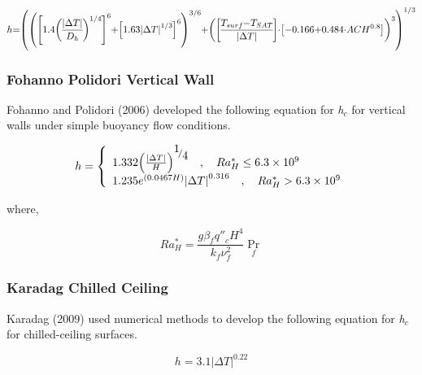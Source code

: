 \begin{equation}
\medmuskip=0mu
\thinmuskip=0mu
\thickmuskip=0mu
\nulldelimiterspace=0pt
\scriptspace=0pt
h = \left(
   \left(
    \left[
     1.4 \left(
      \frac{
       \left|
        \Delta T
       \right|
      }{
       D_h
      }
     \right)^{1/4}
    \right]^6 +
    \left[
     1.63 \left|\Delta T\right|^{1/3}
    \right]^6
   \right)^{3/6} +
   \left(
    \left[
     \frac{
      T_{surf}-T_{SAT}
     }{
      \left|\Delta T\right|
     }
    \right]
    \cdot
    \left[
     -0.166 + 0.484 \cdot ACH^{0.8}
    \right]
   \right)^3
  \right)^{1/3}
\end{equation}

\subsubsection{Fohanno Polidori Vertical Wall}\label{fohanno-polidori-vertical-wall}

Fohanno and Polidori (2006) developed the following equation for \emph{h\(_{c}\)} for vertical walls under simple buoyancy flow conditions.

\begin{equation}
h = \left\{ \begin{array}{l}1.332{\left( {\frac{{\left| {\Delta T} \right|}}{H}} \right)^{{\raise0.7ex\hbox{1} \!\mathord{\left/ {\vphantom {1 4}}\right.}\!\lower0.7ex\hbox{4}}}}\quad ,\quad Ra_H^* \le 6.3 \times {10^9}\\1.235{e^{\left( {0.0467H} \right)}}{\left| {\Delta T} \right|^{0.316}}\quad ,\quad Ra_H^* > 6.3 \times {10^9}\end{array} \right.
\end{equation}

where,

\begin{equation}
Ra_H^* = \frac{{g{\beta_f}{{q''}_c}{H^4}}}{{{k_f}\nu_f^2}}{\Pr_f}
\end{equation}

\subsubsection{Karadag Chilled Ceiling}\label{karadag-chilled-ceiling}

Karadag (2009) used numerical methods to develop the following equation for \emph{h\(_{c}\)} for chilled-ceiling surfaces.

\begin{equation}
h = 3.1{\left| {\Delta T} \right|^{0.22}}
\end{equation}


